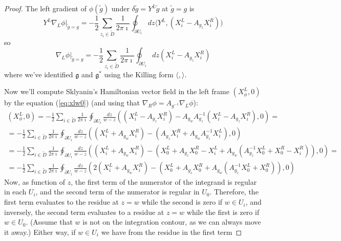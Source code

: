 \documentclass[11pt, oneside, reqno]{amsart}
\theoremstyle{definition} \newtheorem{definition}{Definition}[section]
\theoremstyle{definition} \newtheorem{remark}[definition]{Remark}
\theoremstyle{definition} \newtheorem{remarks}[definition]{Remarks}
\theoremstyle{definition} \newtheorem{question}[definition]{Question}
\theoremstyle{definition} \newtheorem*{note}{Note}
\theoremstyle{definition} \newtheorem{example}[definition]{Example}
\theoremstyle{definition} \newtheorem{examples}[definition]{Examples}
\renewcommand{\gg}{\mathfrak{g}}
\begin{document}
\begin{proof}
The left gradient of $\phi(\tilde g)$ under $ \delta \tilde g = Y^{L} \tilde g$ at $\tilde g = g$ is
\begin{equation}
  Y^{L} \nabla_{L} \phi|_{\tilde g = g}  = - \frac 1 2  \sum_{z_i \in \tilde D} \frac{1}{2 \pi \imath } \oint_{\partial U_{i}}  dz
 \langle  Y^{L} , (X^{L}_i - A_{g_z} X_i^R) ) 
\end{equation}
so 
\begin{equation}
  \nabla_{L} \phi|_{\tilde g = g}  = -\frac 1 2  \sum_{z_i \in \tilde D} \frac{1}{2 \pi \imath } \oint_{\partial U_{i}}  dz
 (X^{L}_i - A_{g_z} X_i^R) 
\end{equation}
where we've identified $\gg$ and $\gg^{*}$ using the Killing form $\langle , \rangle$. 

Now we'll compute Sklyanin's Hamiltonian vector field in the left frame
$(X_{\phi}^{L}, 0)$ by the equation (\ref{eq:xlw0}) (and using that $\nabla_{R} \phi  =
A_{g^{-1}} \nabla_{L} \phi$):
\begin{multline}
  (X^{L}_\phi, 0) = -\frac 1 2 \sum_{i \in \tilde D} \frac{1}{2 \pi \imath} \oint_{\partial U_i}
  \frac{dz}{w - z} ( (X_i^{L} - A_{g_z} X_i^{R})  - A_{g_w} A_{g_z}^{-1} (X_i^{L} - A_{g_z} X_i^{R}),0) =\\
=  -\frac 1 2 \sum_{i \in \tilde D} \frac{1}{2 \pi \imath} \oint_{\partial U_i}
\frac{dz}{w - z} ( (X_i^{L}  + A_{g_w} X_i^{R}) - (A_{g_z} X_i^{R} +  A_{g_{w}} A_{g_{z}}^{-1} X_i^{L}),0) \\
 = -\frac 1 2  \sum_{i \in \tilde D} \frac{1}{2 \pi \imath} \oint_{\partial U_i}
 \frac{dz}{w - z} ( (X_i^{L}  + A_{g_w} X_i^{R}) - (X_0^{L} + A_{g_z} X_0^{R}- X_{i}^{L} +  A_{g_{w}} ( A_{g_{z}}^{-1} X_0^{L} + X_0^{R} - X_{i}^{R})),0)= \\
  = -\frac 1 2  \sum_{i \in \tilde D} \frac{1}{2 \pi \imath} \oint_{\partial U_i}
    \frac{dz}{w - z} ( 2 (X_i^{L}  + A_{g_w} X_i^{R}) - (X_0^{L} + A_{g_z} X_0^{R} +  A_{g_{w}} ( A_{g_{z}}^{-1} X_0^{L} + X_0^{R} )),0)
  \end{multline}
  Now, as function of $z$, the first term of the numerator of the integrand is regular in each $U_i$, and the second term of the numerator is regular in $U_0$. Therefore,
  the first term  evaluates to the residue at $z = w$ while the second is zero if $w \in U_i$,
  and inversely,  the second term evaluates to a residue at $z = w$
 while the first is zero if $w \in U_0$. (Assume that $w$ is not on the integration
  contour, as we can always move it away.)
Either way, if $w \in U_i$ we have from the residue in the first term

\end{proof}
\end{document}
